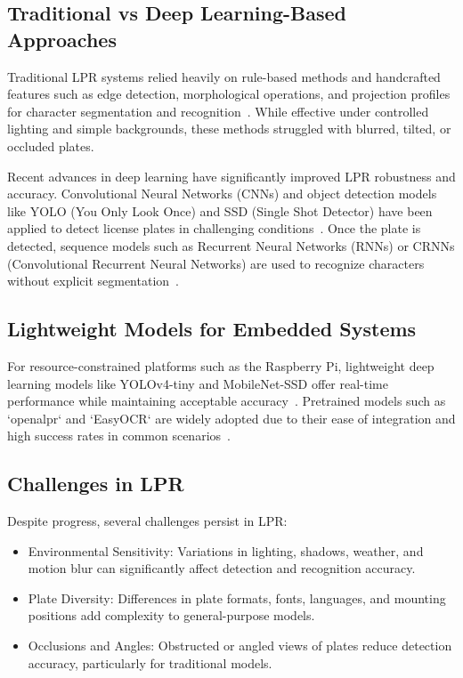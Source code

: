 \subsection*{Traditional vs Deep Learning-Based Approaches}

Traditional LPR systems relied heavily on rule-based methods and handcrafted features such as edge detection, morphological operations, and projection profiles for character segmentation and recognition~\cite{traditional_lpr}. While effective under controlled lighting and simple backgrounds, these methods struggled with blurred, tilted, or occluded plates.

Recent advances in deep learning have significantly improved LPR robustness and accuracy. Convolutional Neural Networks (CNNs) and object detection models like YOLO (You Only Look Once) and SSD (Single Shot Detector) have been applied to detect license plates in challenging conditions~\cite{yolo_lpr}. Once the plate is detected, sequence models such as Recurrent Neural Networks (RNNs) or CRNNs (Convolutional Recurrent Neural Networks) are used to recognize characters without explicit segmentation~\cite{crnn_lpr}.

\subsection*{Lightweight Models for Embedded Systems}

For resource-constrained platforms such as the Raspberry Pi, lightweight deep learning models like YOLOv4-tiny and MobileNet-SSD offer real-time performance while maintaining acceptable accuracy~\cite{mobilenet_lpr}. Pretrained models such as `openalpr` and `EasyOCR` are widely adopted due to their ease of integration and high success rates in common scenarios~\cite{easyocr}.

\subsection*{Challenges in LPR}

Despite progress, several challenges persist in LPR:
\begin{itemize}
    \item {Environmental Sensitivity:} Variations in lighting, shadows, weather, and motion blur can significantly affect detection and recognition accuracy.
    \item {Plate Diversity:} Differences in plate formats, fonts, languages, and mounting positions add complexity to general-purpose models.
    \item {Occlusions and Angles:} Obstructed or angled views of plates reduce detection accuracy, particularly for traditional models.
\end{itemize}

